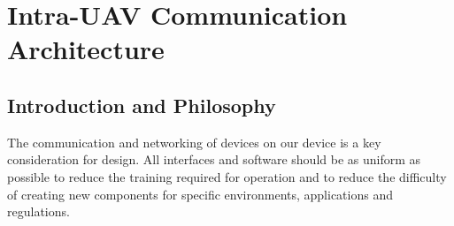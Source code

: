 \newpage
{}
\section{Intra-UAV Communication Architecture} \label{Intra Communication}

\subsection{Introduction and Philosophy}
The communication and networking of devices on our device is a key consideration for design. All interfaces and software should be as uniform as possible to reduce the training required for operation and to reduce the difficulty of creating new components for specific environments, applications and regulations.


